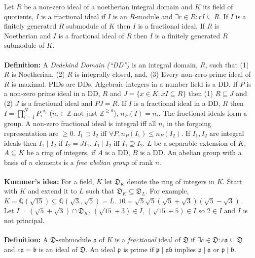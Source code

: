Let $R$ be a non-zero ideal of a noetherian integral domain and $K$ its
field of quotients, $I$ is a fractional ideal if $I$ is an $R$-module and
$\exists r \in R: rI \subseteq R$.  If $I$ is a finitely generated $R$
submodule of $K$ then $I$ is a fractional ideal.  If $R$ is Noetherian and $I$
is a fractional ideal of $R$ then $I$ is a finitely generated $R$ submodule of $K$.
\\
\\
{\bf Definition:}
A \emph{Dedekind Domain (``DD'')} is an integral domain, $R$, such that 
(1) $R$ is Noetherian,
(2) $R$ is integrally closed, and, (3) Every non-zero prime ideal of $R$ is maximal.
PIDs are DDs.  Algebraic integers in a number field is a DD.  If $P$ is a non-zero
prime ideal in a DD, $R$ and $J=\{x \in K: xI \subseteq R \}$ then
(1) $R \subseteq J$ and (2) $J$ is a fractional ideal and $PJ=R$.  If $I$
is a fractional ideal in a DD, $R$ then $I= \prod_{i=1}^N {P_i}^{n_i}$ 
($n_i \in {\mathbb Z}$ not just ${\mathbb Z}^{\ge 0}$), $n_P(I)=n_i$.  The
fractional ideals form a group.  A non-zero fractional ideal is integral iff all
$n_i$ in the forgoing representation are $\ge 0$.  $I_1 \supset I_2$ iff
$\forall P, n_P(I_1) \le n_P(I_2)$.  If $I_1 , I_2$ are integral ideals then
$I_1 \mid I_2$ if $I_2= J I_1$.  $I_1 \mid I_2$ iff $I_1 \supseteq I_2$.
$L$ be a separable extension of $K$, 
$A \subseteq K$ be a ring of integers, if $A$ is a DD, $B$ is a DD.
An abelian group with a basis of $n$ elements is a \emph{free abelian
group} of rank $n$.
\\
\\
{\bf Kummer's idea:}  For a field, $K$ let
${\mathfrak D}_K$ denote the ring of integers in $K$.
Start with $K$ and extend it to $L$ such that
${\mathfrak D}_K \subseteq {\mathfrak D}_L$.  For example, 
$K={\mathbb Q}(\sqrt {15}) \subseteq {\mathbb Q}({\sqrt {3}}, {\sqrt {5}})= L$.
$10 = {\sqrt{5}} {\sqrt{5}} ({\sqrt{5}} + {\sqrt{3}}) ({\sqrt{5}} - {\sqrt{3}})$.
Let $I= ({\sqrt{5}} + {\sqrt{3}}) \cap {\mathfrak D}_K$.  
$({\sqrt{15}} + 3) \in I$,
$({\sqrt{15}} + 5) \in I$ so $2 \in I$ and $I$ is not principal.
\\
\\
{\bf Definition:} A ${\mathfrak D}$-submodule ${\mathfrak a}$ of $K$ is a 
\emph{fractional} ideal of ${\mathfrak D}$ if $\exists c \in {\mathfrak D}:
c{\mathfrak a} \subseteq {\mathfrak D}$ and $c {\mathfrak a} = {\mathfrak b}$ is an
ideal of ${\mathfrak D}$.  An ideal ${\mathfrak p}$ is prime if
${\mathfrak p} \mid {\mathfrak a} {\mathfrak b}$ implies
${\mathfrak p} \mid {\mathfrak a}$ or ${\mathfrak p} \mid {\mathfrak b}$.
